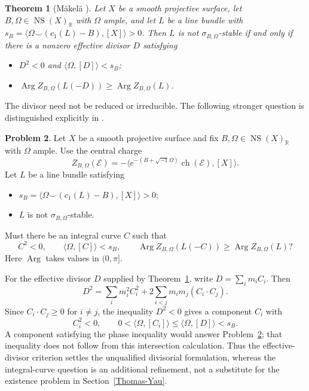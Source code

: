 \documentclass[12pt,reqno]{amsart}
\numberwithin{equation}{section}
\theoremstyle{plain}
\newtheorem{theorem}{Theorem}[section]
\theoremstyle{definition}
\newtheorem{problem}[theorem]{Problem}
\newcommand{\R}{\mathbb R}
\DeclareMathOperator{\NS}{NS}
\begin{document}
\begin{theorem}[M\"akel\"a {\cite[Theorem 1.1(a)]{Mak26}}]
\label{thm-effective-divisor-detector}
Let $X$ be a smooth projective surface, let $B,\Omega\in\NS(X)_\R$
with $\Omega$ ample, and let $L$ be a line bundle with
$s_B=\langle\Omega\smile(c_1(L)-B),[X]\rangle>0$.
Then $L$ is not $\sigma_{B,\Omega}$-stable if and only if there is a
nonzero effective divisor $D$ satisfying
\begin{itemize}
\item $D^2<0$ and $\langle\Omega,[D]\rangle<s_B$;
\item $\operatorname{Arg}Z_{B,\Omega}(L(-D))
       \geq\operatorname{Arg}Z_{B,\Omega}(L)$.
\end{itemize}
\end{theorem}
The divisor need not be reduced or irreducible. The following stronger
question is distinguished explicitly in \cite[Remark 1.2]{Mak26}.

\begin{problem}
\label{problem-integral-curve-detector}
Let $X$ be a smooth projective surface and fix $B,\Omega\in\NS(X)_\R$
with $\Omega$ ample. Use the central charge
\[
 Z_{B,\Omega}(\mathcal E)
 =-\big\langle e^{-(B+\sqrt{-1}\Omega)}
 \operatorname{ch}(\mathcal E),[X]\big\rangle.
\]
Let $L$ be a line bundle satisfying
\begin{itemize}
\item $s_B=\langle\Omega\smile(c_1(L)-B),[X]\rangle>0$;
\item $L$ is not $\sigma_{B,\Omega}$-stable.
\end{itemize}
Must there be an integral curve $C$ such that
\[
 C^2<0,\qquad \langle\Omega,[C]\rangle<s_B,\qquad
 \operatorname{Arg}Z_{B,\Omega}(L(-C))
 \geq\operatorname{Arg}Z_{B,\Omega}(L)?
\]
Here $\operatorname{Arg}$ takes values in $(0,\pi]$.
\end{problem}

For the effective divisor $D$ supplied by
Theorem~\ref{thm-effective-divisor-detector}, write
$D=\sum_i m_iC_i$. Then
\[
 D^2=\sum_i m_i^2C_i^2+
       2\sum_{i<j}m_im_j(C_i\cdot C_j).
\]
Since $C_i\cdot C_j\geq0$ for $i\ne j$, the inequality $D^2<0$
gives a component $C_i$ with
\[
 C_i^2<0,\qquad
 0<\langle\Omega,[C_i]\rangle\leq\langle\Omega,[D]\rangle<s_B.
\]
A component satisfying the phase inequality would answer
Problem~\ref{problem-integral-curve-detector}; that inequality does not
follow from this intersection calculation. Thus the effective-divisor
criterion settles the unqualified divisorial formulation, whereas the
integral-curve question is an additional refinement, not a substitute
for the existence problem in Section~\ref{Thomas-Yau}.
\end{document}
